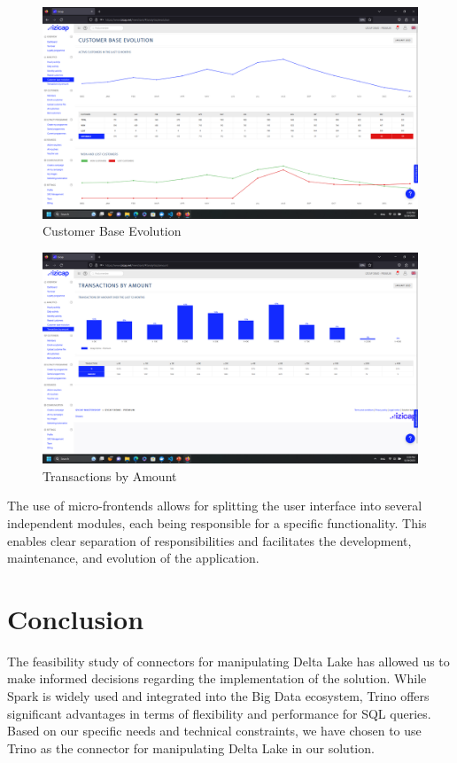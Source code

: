 \begin{figure}[H]
\centering
\includegraphics[width=\linewidth]{images/data-1.png}
\caption{Customer Base Evolution}\label{fig:izicap-3}
\end{figure}

\begin{figure}[H]
\centering
\includegraphics[width=\linewidth]{images/data-2.png}
\caption{Transactions by Amount}\label{fig:izicap-4}
\end{figure}

The use of micro-frontends allows for splitting the user interface into several independent modules, each being responsible for a specific functionality. This enables clear separation of responsibilities and facilitates the development, maintenance, and evolution of the application.

\section*{Conclusion}
The feasibility study of connectors for manipulating Delta Lake has allowed us to make informed decisions regarding the implementation of the solution. While Spark is widely used and integrated into the Big Data ecosystem, Trino offers significant advantages in terms of flexibility and performance for SQL queries. Based on our specific needs and technical constraints, we have chosen to use Trino as the connector for manipulating Delta Lake in our solution.